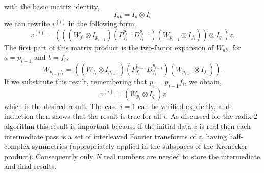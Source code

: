 \documentclass[fleqn,12pt]{article}
\begin{document}
with the basic matrix identity,
%
\begin{equation}
I_{ab} = I_a \otimes I_b
\end{equation}
%
we can rewrite $v^{(i)}$ in the following form,
%
\begin{equation}
v^{(i)} =  (((W_{f_i} \otimes I_{p_{i-1}}) 
                (P^{p_{i-1}}_{f_i} D^{p_{i-1}}_{f_i})
                (W_{p_{i-1}} \otimes I_{f_i})) \otimes I_{q_i}) z .
\end{equation}
%
The first part of this matrix product is the two-factor expansion of
$W_{ab}$, for $a = p_{i-1}$ and $b = f_i$,
%
\begin{equation}
W_{p_{i-1} f_i} = ((W_{f_i} \otimes I_{p_{i-1}}) 
                  (P^{p_{i-1}}_{f_i} D^{p_{i-1}}_{f_i})
                  (W_{p_{i-1}} \otimes I_{f_i})).
\end{equation}
%
If we substitute this result, remembering that $p_i = p_{i-1} f_i$, we
obtain,
%
\begin{equation}
v^{(i)} = (W_{p_i} \otimes I_{q_i}) z
\end{equation}
%
which is the desired result. The case $i=1$ can be verified
explicitly, and induction then shows that the result is true for all
$i$.  As discussed for the radix-2 algorithm this result is important
because if the initial data $z$ is real then each intermediate pass is
a set of interleaved Fourier transforms of $z$, having half-complex
symmetries (appropriately applied in the subspaces of the Kronecker
product). Consequently only $N$ real numbers are needed to store the
intermediate and final results.
\end{document}

